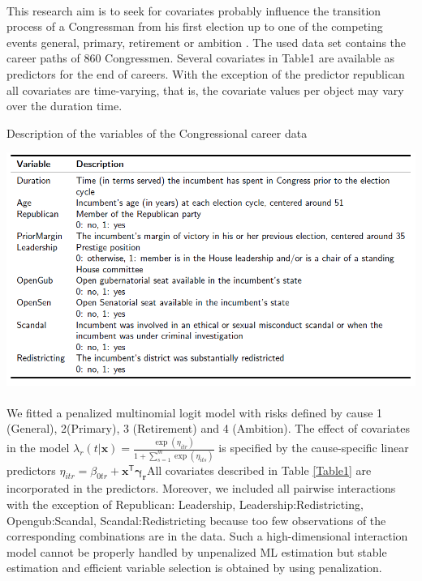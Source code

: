 \documentclass[]{article}
\begin{document}
        \paragraph{}This research aim is to seek for covariates probably influence the transition process of  a Congressman from his first election up to one of the competing events general, primary, retirement or ambition . The used data set contains the career paths of  860 Congressmen. Several covariates  in Table1 are available as predictors for the end of careers. With the exception of the predictor republican all covariates are time-varying, that is, the covariate values per object may vary over the duration time.
        \begin{table}
            \caption{Description of the variables of the Congressional career data}
            \label{Table1}
            \includegraphics[width=\linewidth]{Table1.png}
        \end{table}
        \paragraph{}We fitted a penalized multinomial logit model with risks defined by cause 1 (General), 2(Primary), 3 (Retirement) and 4 (Ambition). The effect of covariates in the model $\lambda_r(t|\mathbf{x}) = \frac{ \exp{ ( \eta_{itr} ) } }{ 1+ \sum_{s=1}^{m} \exp{ (\eta_{its}) }  }$ is specified by the cause-specific linear predictors $\eta_{itr} = \beta_{0tr}+\mathbf{x}^\mathsf{T} \mathbf{\gamma_r}$All covariates described in Table \ref{Table1} are incorporated in the predictors. Moreover, we included all pairwise interactions with the exception of  Republican: Leadership, Leadership:Redistricting, Opengub:Scandal, Scandal:Redistricting because too few observations of the corresponding combinations are in the data. Such a high-dimensional interaction model cannot be properly handled by unpenalized ML estimation but stable estimation and efficient variable selection is obtained by using penalization. 
\end{document}
